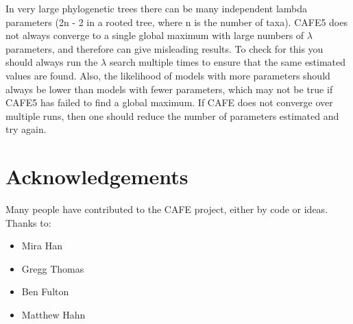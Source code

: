 \documentclass{article}
\newcommand{\shortname}{CAFE5 }
\begin{document}
In very large phylogenetic trees there can be many independent lambda parameters (2n - 2 in a rooted tree, where n is the number of taxa). \shortname does not always converge to a single global maximum with large numbers of $\lambda$ parameters, and therefore can give misleading results. To check for this you should always run the $\lambda$ search multiple times to ensure that the same estimated values are found. Also, the likelihood of models with more parameters should always be lower than models with fewer parameters, which may not be true if \shortname has failed to find a global maximum. If CAFE does not converge over multiple runs, then one should reduce the number of parameters estimated and try again.
\section{Acknowledgements}
Many people have contributed to the CAFE project, either by code or ideas. Thanks to:
\begin{itemize}
  \item Mira Han
  \item Gregg Thomas
  \item Ben Fulton
  \item Matthew Hahn
\end{itemize}


\end{document}
